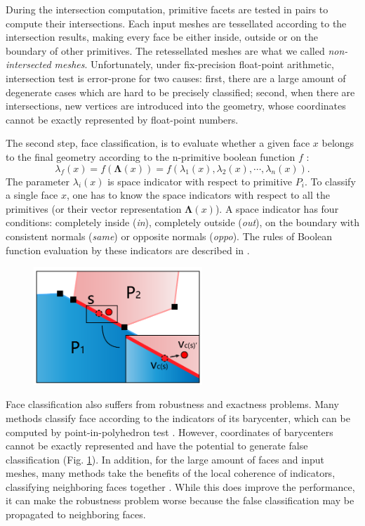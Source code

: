 \documentclass[10pt,journal,compsoc]{IEEEtran}
\begin{document}
During the intersection computation, primitive facets are tested in pairs to compute their intersections. Each input meshes are tessellated according to the intersection results, making every face be either inside, outside or on the boundary of other primitives. The retessellated meshes are what we called \emph{non-intersected meshes}. Unfortunately, under fix-precision float-point arithmetic, intersection test is error-prone for two causes: first, there are a large amount of degenerate cases which are hard to be precisely classified; second, when there are intersections, new vertices are introduced into the geometry, whose coordinates cannot be exactly represented by float-point numbers.

The second step, face classification, is to evaluate whether a given face $x$ belongs to the final geometry according to the n-primitive boolean function $f$ :
\begin{equation}
\lambda_f(x) = f(\boldsymbol{\Lambda}(x)) = f(\lambda_1(x), \lambda_2(x), \cdots, \lambda_n(x)).
\end{equation}
The parameter $\lambda_i(x)$ is space indicator with respect to primitive $P_i$. To classify a single face $x$, one has to know the space indicators with respect to all the primitives (or their vector representation $\boldsymbol{\Lambda}(x)$). A space indicator has four conditions: completely inside (\emph{in}), completely outside (\emph{out}), on the boundary with consistent normals (\emph{same}) or opposite normals (\emph{oppo}). The rules of Boolean function evaluation by these indicators are described in \cite{douze2015quickcsg,feito2013fast}.

\begin{figure}[t]
\centering
\includegraphics[width=2.5in]{falseclass}
\caption{{\color{red}{Sketch: False classification}}}
\label{fig:falseclass}
\end{figure}

Face classification also suffers from robustness and exactness problems. Many methods classify face according to the indicators of its barycenter, which can be computed by point-in-polyhedron test \cite{feito2013fast,campen2010exact}. However, coordinates of barycenters cannot be exactly represented and have the potential to generate false classification (Fig. \ref{fig:falseclass}). In addition, for the large amount of faces and input meshes, many methods take the benefits of the local coherence of indicators, classifying neighboring faces together \cite{pavic2010hybrid,feito2013fast,ogayar2015deferred,zhou2016mesh}. While this does improve the performance, it can make the robustness problem worse because the false classification may be propagated to neighboring faces.
\end{document}

